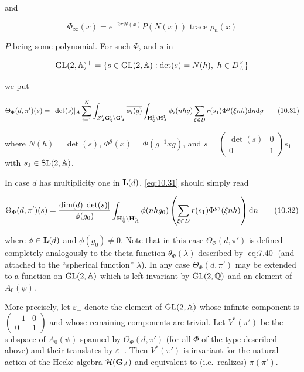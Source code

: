 and

\begin{equation}\label{eq:10.30}
\Phi_\infty(x) = e^{-2\pi N(x)}P(N(x)) \text{ trace } \rho_n(x)\tag{10.30}
\end{equation}

$P$ being some polynomial. For such $\Phi$, and $s$ in

\[
\operatorname{GL}(2, \mathbb{A})^+ = \{s \in \operatorname{GL}(2, \mathbb{A}): \det(s) = N(h), \ h \in D_A^{\times}\}
\]

we put

\begin{equation}\label{eq:10.31}
\Theta_\Phi(d, \pi')(s) = |\det(s)|_A \sum_{i = 1}^{N} \int_{Z'_A \mathbf{G}'_{\mathbb{Q}} \backslash \mathbf{G}'_A} \overline{\phi_i(g)} \int_{\mathbf{H}^1_{\mathbb{Q}} \backslash \mathbf{H}^1_A} \phi_i(nhg) \sum_{\xi \in D} r(s_1)\Phi^g(\xi nh) \mathrm{d} n \mathrm{d} g\tag{10.31}
\end{equation}

where $N(h) = \det(s)$, $\Phi^g(x) = \Phi(g^{-1}xg)$, and $s = \begin{pmatrix} \det(s) & 0 \\ 0 & 1 \end{pmatrix}s_1$ with $s_1 \in \operatorname{SL}(2, \mathbb{A})$.

In case $d$ has multiplicity one in $\mathbf{L}(d)$, \eqref{eq:10.31} should simply read

\begin{equation}\label{eq:10.32}
\Theta_\Phi(d, \pi')(s) = \frac{\dim(d)|\det(s)|}{\phi(g_0)} \int_{\mathbf{H}^1_{\mathbb{Q}} \backslash \mathbf{H}^1_A} \phi(nhg_0)\left(\sum_{\xi \in D} r(s_1)\Phi^{g_0}(\xi nh)\right) \mathrm{d} n\tag{10.32}
\end{equation}

where $\phi \in \mathbf{L}(d)$ and $\phi(g_0) \neq 0$. Note that in this case $\Theta_\Phi(d, \pi')$ is defined completely analogously to the theta function $\theta_\Phi(\lambda)$ described by \eqref{eq:7.40} (and attached to the ``spherical function'' $\lambda$). In any case $\Theta_\Phi(d, \pi')$ may be extended to a function on $\operatorname{GL}(2, \mathbb{A})$ which is left invariant by $\operatorname{GL}(2, \mathbb{Q})$ and an element of $A_0(\psi)$.

More precisely, let $\varepsilon_-$ denote the element of $\operatorname{GL}(2, \mathbb{A})$ whose infinite component is $\begin{pmatrix} -1 & 0 \\ 0 & 1 \end{pmatrix}$ and whose remaining components are trivial. Let $V^*(\pi')$ be the subspace of $A_0(\psi)$ spanned by $\Theta_\Phi(d, \pi')$ (for all $\Phi$ of the type described above) and their translates by $\varepsilon_-$. Then $V^*(\pi')$ is invariant for the natural action of the Hecke algebra $\mathcal{H}(\mathbf{G}_A)$ and equivalent to (i.e.\ realizes) $\pi(\pi')$.

